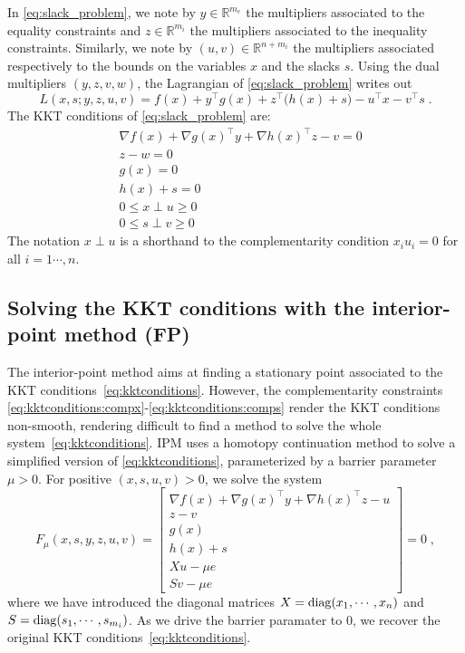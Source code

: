 In \eqref{eq:slack_problem},
we note by $y \in \mathbb{R}^{m_e}$ the multipliers associated
to the equality constraints and $z \in \mathbb{R}^{m_i}$ the multipliers
associated to the inequality constraints. Similarly, we note
by $(u, v) \in \mathbb{R}^{n + m_i}$ the multipliers associated
respectively to the bounds on the variables $x$ and the slacks $s$.
Using the dual multipliers $(y, z, v, w)$,
the Lagrangian of \eqref{eq:slack_problem} writes out
\begin{equation}
  \label{eq:lagrangian}
  L(x, s; y, z, u, v) = f(x) + y^\top g(x) + z^\top \big(h(x) +s\big)
  - u^\top x - v^\top s \; .
\end{equation}
The KKT conditions of \eqref{eq:slack_problem} are:
\begin{subequations}
  \label{eq:kktconditions}
    \begin{align}
      & \nabla f(x) + \nabla g(x)^\top y + \nabla h(x)^\top z - v = 0 \\
      & z - w = 0 \\
      & g(x) = 0 \\
      & h(x) + s = 0 \\
      \label{eq:kktconditions:compx}
      & 0 \leq x \perp u \geq 0 \\
      \label{eq:kktconditions:comps}
      & 0 \leq s \perp v \geq 0
    \end{align}
\end{subequations}
The notation $x \perp u$ is a shorthand to the complementarity
condition $x_i u_i = 0$ for all $i=1\cdots, n$.

\subsection{Solving the KKT conditions with the interior-point method (FP)}
\label{sec:ipm:kkt}
The interior-point method aims at finding a stationary point
associated to the KKT conditions~\eqref{eq:kktconditions}. However,
the complementarity constraints \eqref{eq:kktconditions:compx}-\eqref{eq:kktconditions:comps}
render the KKT conditions non-smooth, rendering difficult to find a method
to solve the whole system~\eqref{eq:kktconditions}.
IPM uses a homotopy continuation method to solve a simplified
version of \eqref{eq:kktconditions}, parameterized by a barrier
parameter $\mu > 0$. For positive $(x, s, u, v) > 0$, we solve the system
\begin{equation}
  \label{eq:kkt_ipm}
  F_\mu(x, s, y, z, u, v) =
  \begin{bmatrix}
       \nabla f(x) + \nabla g(x)^\top y + \nabla h(x)^\top z - u  \\
       z - v  \\
       g(x)  \\
       h(x) + s  \\
       X u - \mu e  \\
       S v - \mu e
  \end{bmatrix}
  = 0 \; ,
\end{equation}
where we have introduced the diagonal matrices $X = \operatorname{diag}(x_1, \cdots, x_n)$
and $S = \operatorname{diag}(s_1, \cdots, s_{m_i})$.
As we drive the barrier paramater to $0$, we recover the original
KKT conditions~\eqref{eq:kktconditions}.

